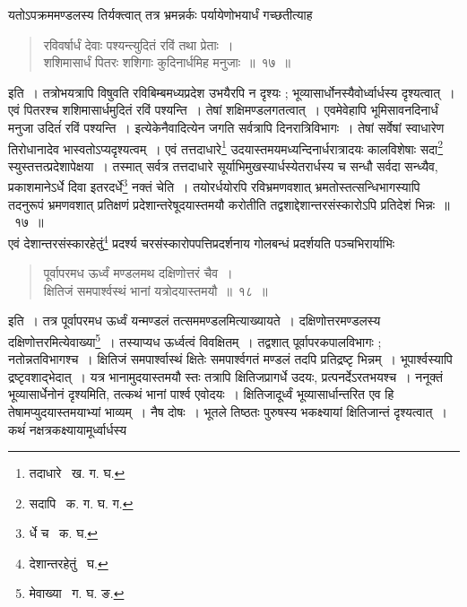 \documentclass[11pt, openany]{book}
\begin{document}
\indent यतोऽपक्रममण्डलस्य तिर्यक्त्वात् तत्र भ्रमन्नर्कः पर्यायेणोभयार्धं गच्छतीत्याह\textendash 
\begin{quote}
{\ab रविवर्षार्धं देवाः पश्यन्त्युदितं रविं तथा प्रेताः~। \\
शशिमासार्धं पितरः शशिगाः कुदिनार्धमिह मनुजाः~॥~१७~॥}  
\end{quote}

\newpage

\indent इति~। तत्रोभयत्रापि विषुवति रविबिम्बमध्यप्रदेश उभयैरपि न दृश्यः ; भूव्यासार्धोनस्यैवोर्ध्वार्धस्य दृश्यत्वात्~। एवं 
पितरश्च शशिमासार्धमुदितं रविं पश्यन्ति~। तेषां शक्षिमण्डलगतत्वात्~। एवमेवेहापि भूमिसावनदिनार्धं मनुजा उदितंं रविं पश्यन्ति~। इत्येकेनैवादित्येन जगति सर्वत्रापि दिनरात्रिविभागः~। तेषां सर्वेषां स्वाधारेण तिरोधानादेव भास्वतोऽप्यदृश्यत्वम्~। एवं तत्तदाधारे\renewcommand{\thefootnote}{१}\footnote{तदाधारे \textendash\ ख. ग. घ.} उदयास्तमयमध्यन्दिनार्धरात्रादयः कालविशेषाः सदा\renewcommand{\thefootnote}{२}\footnote{सदापि \textendash\ क. ग. घ. ग.} स्युस्तत्तत्प्रदेशापेक्षया~। तस्मात् सर्वत्र तत्तदाधारे सूर्याभिमुखस्यार्धस्येतरार्धस्य च सन्धौ सर्वदा सन्ध्यैव, प्रकाशमानेऽर्धे दिवा इतरदर्धे\renewcommand{\thefootnote}{३}\footnote{र्धे च \textendash\ क. घ.} नक्तं चेति~। तयोरर्धयोरपि रविभ्रमणवशात् भ्रमतोस्तत्सन्धिभागस्यापि तदनुरूपं भ्रमणवशात् प्रतिक्षणं प्रदेशान्तरेषूदयास्तमयौ करोतीति 
तद्वशाद्देशान्तरसंस्कारोऽपि प्रतिदेशं भिन्नः~॥~१७~॥ \\


\indent एवं देशान्तरसंस्कारहेतुं\renewcommand{\thefootnote}{४}\footnote{देशान्तरहेतुं \textendash\ घ.} प्रदर्श्य चरसंस्कारोपपत्तिप्रदर्शनाय गोलबन्धं प्रदर्शयति पञ्चभिरार्याभिः\textendash 
\begin{quote}
{\ab पूर्वापरमध ऊर्ध्वं मण्डलमथ दक्षिणोत्तरं चैव~। \\
 क्षितिजं समपार्श्वस्थं भानां यत्रोदयास्तमयौ~॥~१८~॥} 
\end{quote}

\indent इति~। तत्र पूर्वापरमध ऊर्ध्वं यन्मण्डलं तत्सममण्डलमित्याख्यायते~। दक्षिणोत्तरमण्डलस्य दक्षिणोत्तरमित्येवाख्या\renewcommand{\thefootnote}{५}\footnote{मेवाख्या \textendash\ ग. घ. ङ.}~। तस्याप्यध ऊर्ध्वत्वं विवक्षितम्~। तद्वशात् पूर्वापरकपालविभागः ; नतोन्नतविभागश्च~। क्षितिजं समपार्श्वास्थं क्षितेः समपार्श्वगतं मण्डलं तदपि प्रतिद्रष्टृ भिन्नम्~। भूपार्श्वस्यापि द्रष्टृवशाद्भेदात्~। यत्र भानामुदयास्तमयौ स्तः तत्रापि क्षितिजप्रागर्धे उदयः, प्रत्पनर्देऽरतभयश्च~। ननूक्तं भूव्यासार्धेनोनं दृश्यमिति, तत्कथं भानां पार्श्व एवोदयः~। क्षितिजादूर्ध्वं भूव्यासार्धान्तरित एव हि तेषामप्युदयास्तमयाभ्यां भाव्यम्~। नैष दोषः~। भूतले तिष्ठतः पुरुषस्य भकक्ष्यायां क्षितिजान्तं दृश्यत्वात्~। कथंं नक्षत्रकक्ष्यायामूर्ध्वार्धस्य 
\end{document}
